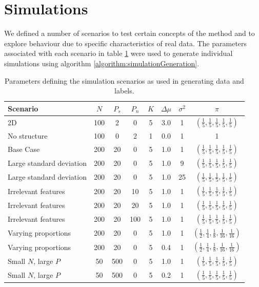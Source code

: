 \documentclass[]{article}
\begin{document}
\section{Simulations} \label{sec:simulations}
We defined a number of scenarios to test certain concepts of the method and to explore behaviour due to specific characteristics of real data. The parameters associated with each scenario in table \ref{table:scenarioTable} were used to generate individual simulations using algorithm \ref{algorithm:simulationGeneration}.
\begin{table}[ht]
	\centering
	\begin{tabular}{|l|ccccccc|}
	\hline
	\textbf{Scenario} & $N$ & $P_s$ & $P_n$ & $K$ & $\Delta\mu$ & $\sigma^2$ & $\pi$\\
	\hline 
	2D & 100 & 2 & 0 & 5 & 3.0 & 1 &  $(\frac{1}{5} , \frac{1}{5}, \frac{1}{5}, \frac{1}{5}, \frac{1}{5})$ \\
	No structure & 100 & 0 & 2 & 1 & 0.0 & 1 & 1 \\
	Base Case & 200 & 20 & 0 & 5 & 1.0 & 1 &  $(\frac{1}{5} , \frac{1}{5}, \frac{1}{5}, \frac{1}{5}, \frac{1}{5})$\\
	Large standard deviation & 200 & 20 & 0 & 5 & 1.0 & 9 & $(\frac{1}{5} , \frac{1}{5}, \frac{1}{5}, \frac{1}{5}, \frac{1}{5})$ \\
	Large standard deviation & 200 & 20 & 0 & 5 & 1.0 & 25 &  $(\frac{1}{5} , \frac{1}{5}, \frac{1}{5}, \frac{1}{5}, \frac{1}{5})$\\
	Irrelevant features & 200 & 20 & 10 & 5 & 1.0 & 1 &  $(\frac{1}{5} , \frac{1}{5}, \frac{1}{5}, \frac{1}{5}, \frac{1}{5})$\\
	Irrelevant features & 200 & 20 & 20 & 5 & 1.0 & 1 &  $(\frac{1}{5} , \frac{1}{5}, \frac{1}{5}, \frac{1}{5}, \frac{1}{5})$\\
	Irrelevant features & 200 & 20 & 100 & 5 & 1.0 & 1 &  $(\frac{1}{5} , \frac{1}{5}, \frac{1}{5}, \frac{1}{5}, \frac{1}{5})$\\
	Varying proportions & 200 & 20 & 0 & 5 & 1.0 & 1 & $(\frac{1}{2} , \frac{1}{4}, \frac{1}{8}, \frac{1}{16}, \frac{1}{16})$ \\
	Varying proportions & 200 & 20 & 0 & 5 & 0.4 & 1 &  $(\frac{1}{2} , \frac{1}{4}, \frac{1}{8}, \frac{1}{16}, \frac{1}{16})$ \\ %
	Small $N$, large $P$ & 50 & 500 & 0 & 5 & 1.0 & 1 &  $(\frac{1}{5} , \frac{1}{5}, \frac{1}{5}, \frac{1}{5}, \frac{1}{5})$\\
	Small $N$, large $P$ & 50 & 500 & 0 & 5 & 0.2 & 1 &  $(\frac{1}{5} , \frac{1}{5}, \frac{1}{5}, \frac{1}{5}, \frac{1}{5})$
	\\
	\hline
	\end{tabular}
	\caption{Parameters defining the simulation scenarios as used in generating data and labels.}
	\label{table:scenarioTable}
\end{table}%
\end{document}
